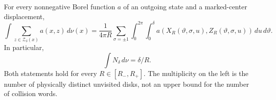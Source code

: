 \begin{theorem}
\label{thm:cf-flux}
For every nonnegative Borel function $a$ of an outgoing state and a
marked-center displacement,
\begin{equation}\label{eq:cf-flux}
 \int\sum_{z\in\mathcal Z_\delta(x)}a(x,z)\,d\nu(x)
 =\frac{1}{4\pi R}\sum_{\sigma=\pm1}
   \int_0^{2\pi}\int_0^\delta
       a(X_R(\vartheta,\sigma,u),Z_R(\vartheta,\sigma,u))
                                  \,du\,d\vartheta.
\end{equation}
In particular,
\begin{equation}\label{eq:cf-exact-mean}
                         \int N_\delta\,d\nu=\delta/R.
\end{equation}
Both statements hold for every $R\in[R_-,R_+]$. The multiplicity on
the left is the number of physically distinct unvisited disks, not
an upper bound for the number of collision words.
\end{theorem}
